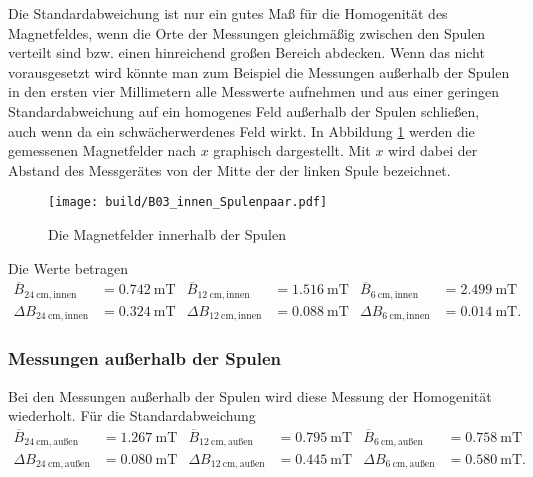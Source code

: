 Die Standardabweichung ist nur ein gutes Maß für die Homogenität des Magnetfeldes, 
wenn die Orte der Messungen gleichmäßig zwischen den Spulen verteilt sind bzw. einen hinreichend großen Bereich abdecken.
Wenn das nicht vorausgesetzt wird könnte man zum Beispiel die Messungen außerhalb der Spulen in den ersten vier Millimetern
alle Messwerte aufnehmen und aus einer geringen Standardabweichung auf ein homogenes Feld außerhalb der Spulen schließen,
auch wenn da ein schwächerwerdenes Feld wirkt.
%
%
In Abbildung \ref{fig:B03_innen} werden die gemessenen Magnetfelder nach $x$ graphisch dargestellt.
Mit $x$ wird dabei der Abstand des Messgerätes von der Mitte der der linken Spule bezeichnet.
\begin{figure}
    \centering
    \caption{Die Magnetfelder innerhalb der Spulen}
    \label{fig:B03_innen}
    \texttt{[image: build/B03\_innen\_Spulenpaar.pdf]}
\end{figure}
%
Die Werte betragen
\begin{align}
    \nonumber   
    \overline{B}_{\qty{24}{\centi\meter},\text{innen}}&= \qty[]{0.742}{\milli\tesla}      &
    \overline{B}_{\qty{12}{\centi\meter},\text{innen}}&= \qty[]{1.516}{\milli\tesla}     &
    \overline{B}_{\qty{6 }{\centi\meter},\text{innen}}&= \qty[]{2.499}{\milli\tesla}     \\
    \Delta B_{\qty{24}{\centi\meter},\text{innen}}&= \qty[]{0.324}{\milli\tesla}      &
    \Delta B_{\qty{12}{\centi\meter},\text{innen}}&= \qty[]{0.088}{\milli\tesla}      &
    \Delta B_{\qty{6 }{\centi\meter},\text{innen}}&= \qty[]{0.014}{\milli\tesla}.
    \label{erg:B03Standardabweichungen} 
\end{align}

\subsubsection{Messungen außerhalb der Spulen}
Bei den Messungen außerhalb der Spulen wird diese Messung der Homogenität wiederholt.
Für die Standardabweichung
\begin{align}
    \nonumber   
    \overline{B}_{\qty{24}{\centi\meter},\text{außen}}&= \qty[]{1.267}{\milli\tesla}      &
    \overline{B}_{\qty{12}{\centi\meter},\text{außen}}&= \qty[]{0.795}{\milli\tesla}     &
    \overline{B}_{\qty{6 }{\centi\meter},\text{außen}}&= \qty[]{0.758}{\milli\tesla}     \\
    \Delta B_{\qty{24}{\centi\meter},\text{außen}}&= \qty[]{0.080}{\milli\tesla}      &
    \Delta B_{\qty{12}{\centi\meter},\text{außen}}&= \qty[]{0.445}{\milli\tesla}      &
    \Delta B_{\qty{6 }{\centi\meter},\text{außen}}&= \qty[]{0.580}{\milli\tesla}.
    \label{erg:B03Standardabweichungen_aussen} 
\end{align}
